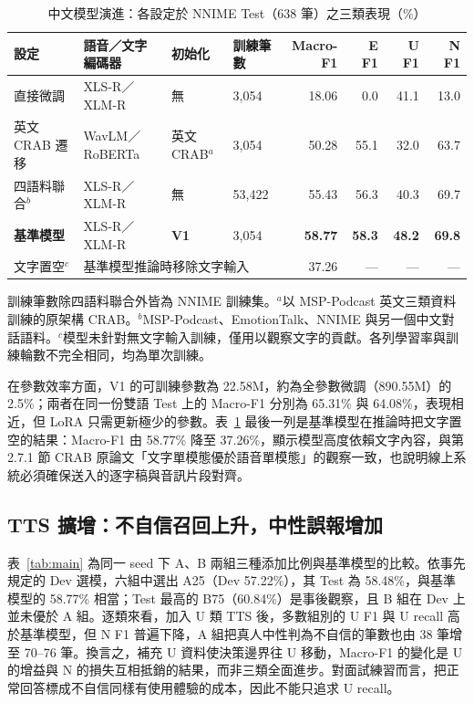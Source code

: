\begin{table}[t]
\centering
\caption{中文模型演進：各設定於 NNIME Test（638 筆）之三類表現（\%）}
\label{tab:evolution}
\small\setlength{\tabcolsep}{2.9pt}
\begin{tabular}{@{}llllrrrr@{}}
\toprule
設定 & 語音／文字編碼器 & 初始化 & 訓練筆數 & Macro-F1 & E F1 & U F1 & N F1\\
\midrule
直接微調 & XLS-R／XLM-R & 無 & 3,054 & 18.06 & 0.0 & 41.1 & 13.0\\
英文 CRAB 遷移 & WavLM／RoBERTa & 英文 CRAB$^{a}$ & 3,054 & 50.28 & 55.1 & 32.0 & 63.7\\
四語料聯合$^{b}$ & XLS-R／XLM-R & 無 & 53,422 & 55.43 & 56.3 & 40.3 & 69.7\\
\textbf{基準模型} & XLS-R／XLM-R & \textbf{V1} & 3,054 & \textbf{58.77} & \textbf{58.3} & \textbf{48.2} & \textbf{69.8}\\
\midrule
文字置空$^{c}$ & \multicolumn{3}{l}{基準模型推論時移除文字輸入} & 37.26 & — & — & —\\
\bottomrule
\end{tabular}
\par\smallskip\footnotesize
訓練筆數除四語料聯合外皆為 NNIME 訓練集。$^{a}$以 MSP-Podcast 英文三類資料訓練的原架構 CRAB。$^{b}$MSP-Podcast、EmotionTalk、NNIME 與另一個中文對話語料。$^{c}$模型未針對無文字輸入訓練，僅用以觀察文字的貢獻。各列學習率與訓練輪數不完全相同，均為單次訓練。
\end{table}

在參數效率方面，V1 的可訓練參數為 22.58M，約為全參數微調（890.55M）的 2.5\%；兩者在同一份雙語 Test 上的 Macro-F1 分別為 65.31\% 與 64.08\%，表現相近，但 LoRA 只需更新極少的參數。表~\ref{tab:evolution} 最後一列是基準模型在推論時把文字置空的結果：Macro-F1 由 58.77\% 降至 37.26\%，顯示模型高度依賴文字內容，與第 2.7.1 節 CRAB 原論文「文字單模態優於語音單模態」的觀察一致，也說明線上系統必須確保送入的逐字稿與音訊片段對齊。

\subsection{TTS 擴增：不自信召回上升，中性誤報增加}
\label{sec:res_tts}

表~\ref{tab:main} 為同一 seed 下 A、B 兩組三種添加比例與基準模型的比較。依事先規定的 Dev 選模，六組中選出 A25（Dev 57.22\%），其 Test 為 58.48\%，與基準模型的 58.77\% 相當；Test 最高的 B75（60.84\%）是事後觀察，且 B 組在 Dev 上並未優於 A 組。逐類來看，加入 U 類 TTS 後，多數組別的 U F1 與 U recall 高於基準模型，但 N F1 普遍下降，A 組把真人中性判為不自信的筆數也由 38 筆增至 70–76 筆。換言之，補充 U 資料使決策邊界往 U 移動，Macro-F1 的變化是 U 的增益與 N 的損失互相抵銷的結果，而非三類全面進步。對面試練習而言，把正常回答標成不自信同樣有使用體驗的成本，因此不能只追求 U recall。

